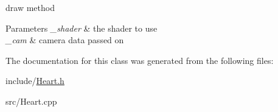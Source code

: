 draw method 


\begin{DoxyParams}{Parameters}
{\em \-\_\-shader} & the shader to use \\
\hline
{\em \-\_\-cam} & camera data passed on \\
\hline
\end{DoxyParams}


The documentation for this class was generated from the following files\-:\begin{DoxyCompactItemize}
\item 
include/\hyperlink{_heart_8h}{Heart.\-h}\item 
src/Heart.\-cpp\end{DoxyCompactItemize}
